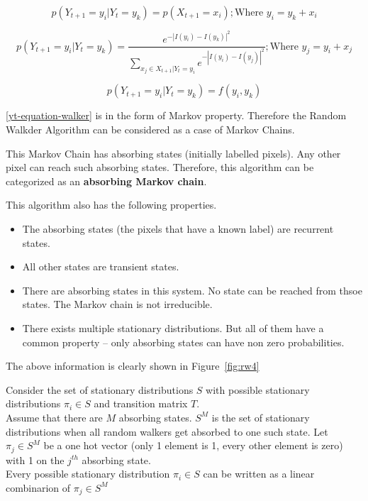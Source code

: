 \documentclass[a4paper]{article}
\newcommand\figref{Figure~\ref}
\begin{document}
$$p(Y_{t+1} = y_i | Y_t = y_k) = p(X_{t+1} = x_i) ; \textrm{Where }y_i = y_k + x_i$$
    
$$p(Y_{t+1} = y_i | Y_t = y_k) = \frac{e^{-|I(y_i) - I(y_k)|^2}} { \sum_{x_j \in X_{t+1}|Y_t=y_i } e^{-|I(y_i) - I(y_j)|^2} } ;\textrm{Where }y_j = y_i + x_j$$

\begin{equation}
    p(Y_{t+1} = y_i | Y_t = y_k) = f(y_i,y_k)  
    \label{yt-equation-walker}
\end{equation}

\eqref{yt-equation-walker} is in the form of Markov property. Therefore the Random Walkder Algorithm can be considered as a case of Markov Chains.

This Markov Chain has absorbing states (initially labelled pixels). Any other pixel can reach such absorbing states. Therefore, this algorithm can be categorized as an \textbf{absorbing Markov chain}.

This algorithm also has the following properties.
\begin{itemize}
    \item The absorbing states (the pixels that have a known label) are recurrent states.
    \item All other states are transient states.
    \item There are absorbing states in this system. No state can be reached from thsoe states. The Markov chain is not irreducible.
    \item There exists multiple stationary distributions. But all of them have a common property -- only absorbing states can have non zero probabilities.
\end{itemize}

The above information is clearly shown in \figref{fig:rw4}


Consider the set of stationary distributions $S$ with possible stationary distributions $\pi_i \in S$ and transition matrix $T$.\\ 
Assume that there are $M$ absorbing states. $S^M$ is the set of stationary distributions when all random walkers get absorbed to one such state. Let $\pi_j \in S^M$ be a one hot vector (only 1 element is 1, every other element is zero) with 1 on the $j^{th}$ absorbing state.\\
Every possible stationary distribution $\pi_i \in S$ can be written as a linear combinarion of $\pi_j \in S^M$
\end{document}
